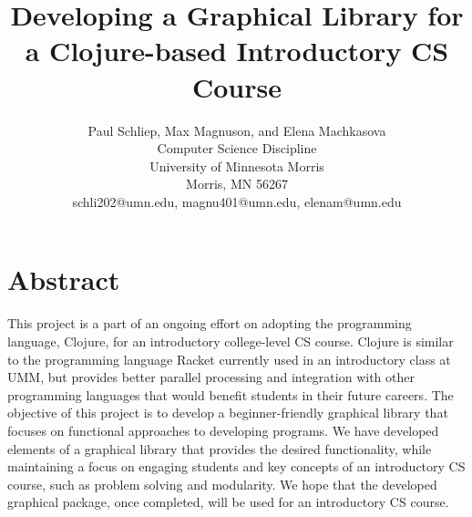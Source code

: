 \documentclass[12pt]{article}
\newcommand{\comment}[1]{{\bf \tt  {#1}}}
\begin{document}
\pagestyle{plain}
%

\title{Developing a Graphical Library for a Clojure-based Introductory CS Course}
%
%

\author{
Paul Schliep, Max Magnuson, and Elena Machkasova \\
Computer Science Discipline \\
University of Minnesota Morris\\
Morris, MN 56267\\
schli202@umn.edu, magnu401@umn.edu, elenam@umn.edu
}

\date{}

\maketitle
\thispagestyle{empty}

\section*{\centering Abstract}
This project is a part of an ongoing effort on adopting the programming language, Clojure, for an introductory college-level CS course. Clojure is similar to the programming language Racket currently used in an introductory class at UMM, but provides better parallel processing and integration with other programming languages that would benefit students in their future careers. The objective of this project is to develop a beginner-friendly graphical library that focuses on functional approaches to developing programs. We have developed elements of a graphical library that provides the desired functionality, while maintaining a focus on engaging students and key concepts of an introductory CS course, such as problem solving and modularity. We hope that the developed graphical package, once completed, will be used for an introductory CS course. 
\end{document}
